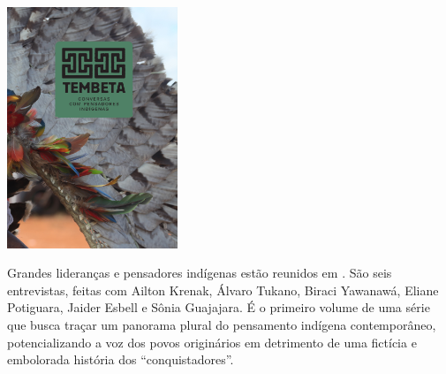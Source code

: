 \pagebreak

\hspace{.5cm}

\begin{center}
\hspace*{-.5cm}\includegraphics[width=51mm]{./imgs/tembeta.jpg}
\end{center}

\hspace*{-7cm}\hrulefill\hspace*{-7cm}

\medskip

\noindent{}Grandes lideranças e pensadores indígenas estão reunidos em {}. São seis entrevistas, feitas com Ailton Krenak, Álvaro Tukano, Biraci Yawanawá, Eliane Potiguara, Jaider Esbell e Sônia Guajajara. É o primeiro volume de uma série que busca traçar um panorama plural do pensamento indígena contemporâneo, potencializando a voz dos povos originários em detrimento de uma fictícia e embolorada história dos “conquistadores”.

\vfill

\hspace*{-.4cm}\begin{minipage}[c]{1\linewidth}
\small{
{}}
\end{minipage}


